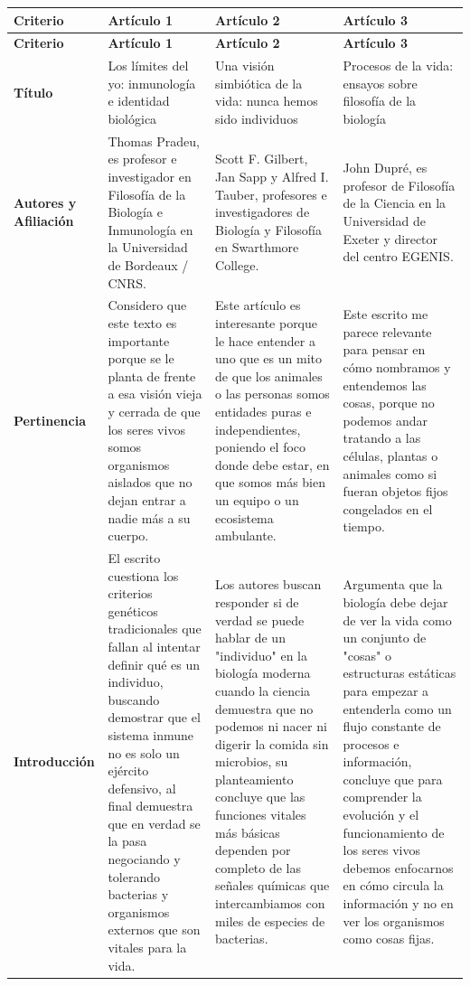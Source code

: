 \documentclass[12pt]{article}
\begin{document}
\begin{longtable}{|>{\raggedright\arraybackslash}p{3cm}|>{\raggedright\arraybackslash}p{4.2cm}|>{\raggedright\arraybackslash}p{4.2cm}|>{\raggedright\arraybackslash}p{4.2cm}|}
\hline
\textbf{Criterio} & \textbf{Artículo 1} & \textbf{Artículo 2} & \textbf{Artículo 3} \\
\hline
\endfirsthead

\hline
\textbf{Criterio} & \textbf{Artículo 1} & \textbf{Artículo 2} & \textbf{Artículo 3} \\
\hline
\endhead

\textbf{Título} & Los límites del yo: inmunología e identidad biológica & Una visión simbiótica de la vida: nunca hemos sido individuos & Procesos de la vida: ensayos sobre filosofía de la biología \\
\hline
\textbf{Autores y Afiliación} & Thomas Pradeu, es profesor e investigador en Filosofía de la Biología e Inmunología en la Universidad de Bordeaux / CNRS. & Scott F. Gilbert, Jan Sapp y Alfred I. Tauber, profesores e investigadores de Biología y Filosofía en Swarthmore College. & John Dupré, es profesor de Filosofía de la Ciencia en la Universidad de Exeter y director del centro EGENIS. \\
\hline
\textbf{Pertinencia} & Considero que este texto es importante porque se le planta de frente a esa visión vieja y cerrada de que los seres vivos somos organismos aislados que no dejan entrar a nadie más a su cuerpo. & Este artículo es interesante porque le hace entender a uno que es un mito de que los animales o las personas somos entidades puras e independientes, poniendo el foco donde debe estar, en que somos más bien un equipo o un ecosistema ambulante. & Este escrito me parece relevante para pensar en cómo nombramos y entendemos las cosas, porque no podemos andar tratando a las células, plantas o animales como si fueran objetos fijos congelados en el tiempo. \\
\hline
\textbf{Introducción} & El escrito cuestiona los criterios genéticos tradicionales que fallan al intentar definir qué es un individuo, buscando demostrar que el sistema inmune no es solo un ejército defensivo, al final demuestra que en verdad se la pasa negociando y tolerando bacterias y organismos externos que son vitales para la vida. & Los autores buscan responder si de verdad se puede hablar de un "individuo" en la biología moderna cuando la ciencia demuestra que no podemos ni nacer ni digerir la comida sin microbios, su planteamiento concluye que las funciones vitales más básicas dependen por completo de las señales químicas que intercambiamos con miles de especies de bacterias. & Argumenta que la biología debe dejar de ver la vida como un conjunto de "cosas" o estructuras estáticas para empezar a entenderla como un flujo constante de procesos e información, concluye que para comprender la evolución y el funcionamiento de los seres vivos debemos enfocarnos en cómo circula la información y no en ver los organismos como cosas fijas. \\

\end{longtable}
\end{document}
